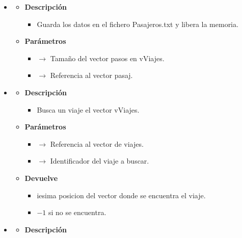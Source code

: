 \begin{itemize}
\begin{itemize}
\begin{itemize}
		\end{itemize}
	\end{itemize}
    \item {}
    \begin{itemize}
        \item \textbf{Descripción}
        \begin{itemize}
			\item  Guarda los datos en el fichero Pasajeros.txt y libera la memoria.
		\end{itemize}
		\item \textbf{Parámetros}
		\begin{itemize}
            \item {} $\rightarrow$ Tamaño del vector pasos en vViajes.
			\item {} $\rightarrow$ Referencia al vector pasaj.
		\end{itemize}
	\end{itemize}
    \item {}
    \begin{itemize}
        \item \textbf{Descripción}
        \begin{itemize}
			\item  Busca un viaje el vector vViajes.
		\end{itemize}
		\item \textbf{Parámetros}
		\begin{itemize}
			\item {} $\rightarrow$ Referencia al vector de viajes.
            \item {} $\rightarrow$ Identificador del viaje a buscar.
		\end{itemize}
        \item \textbf{Devuelve}
		\begin{itemize}
			\item iesima posicion del vector donde se encuentra el viaje.
            \item $-1$ si no se encuentra.
		\end{itemize}
	\end{itemize}
    \item {}
    \begin{itemize}
        \item \textbf{Descripción}
        \begin{itemize}

\end{itemize}
\end{itemize}
\end{itemize}
